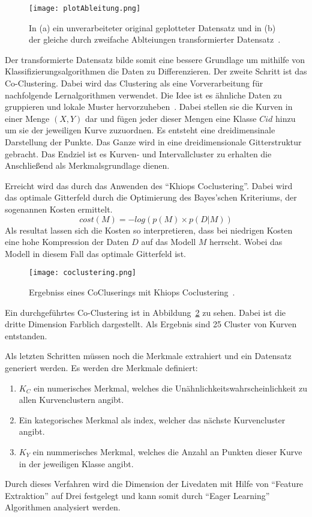 \begin{figure}
  \centering
  \texttt{[image: plotAbleitung.png]}
  \caption{In (a) ein unverarbeiteter original geplotteter Datensatz und in (b) der gleiche durch zweifache Ablteiungen transformierter Datensatz~\cite{Gay2013}.}
  \label{fig:derivative}
\end{figure}

Der transformierte Datensatz bilde somit eine bessere Grundlage um mithilfe von Klassifizierungsalgorithmen die Daten zu Differenzieren. 
Der zweite Schritt ist das Co-Clustering. 
Dabei wird das Clustering als eine Vorverarbeitung für nachfolgende Lernalgorithmen verwendet. 
Die Idee ist es ähnliche Daten zu gruppieren und lokale Muster hervorzuheben~\cite{gay2013feature}. Dabei stellen sie die Kurven in einer Menge $(X,Y)$ dar und fügen jeder dieser Mengen eine Klasse $Cid$ hinzu um sie der jeweiligen Kurve zuzuordnen. Es entsteht eine dreidimensinale Darstellung der Punkte. Das Ganze wird in eine dreidimensionale Gitterstruktur gebracht. Das Endziel ist es Kurven- und Intervallcluster zu erhalten die Anschließend als Merkmalsgrundlage dienen. 

Erreicht wird das durch das Anwenden des \enquote{Khiops Coclustering}\cite{boulle2012functional}. Dabei wird das optimale Gitterfeld durch die Optimierung des Bayes'schen Kriteriums, der sogenannen Kosten ermittelt. 
\begin{equation}
  cost(M) = -log(p(M) \times p(D|M))
  \label{equ:Bayesian}
\end{equation}
Als resultat lassen sich die Kosten so interpretieren, dass bei niedrigen Kosten eine hohe Kompression der Daten $D$ auf das Modell $M$ herrscht. Wobei das Modell in diesem Fall das optimale Gitterfeld ist.

\begin{figure}
  \centering
  \texttt{[image: coclustering.png]}
  \caption{Ergebniss eines CoCluserings mit Khiops Coclustering~\cite{Gay2013}.}
  \label{fig:coclustering}
\end{figure}

Ein durchgeführtes Co-Clustering ist in Abbildung\ \ref{fig:coclustering} zu sehen. Dabei ist die dritte Dimension Farblich dargestellt. Als Ergebnis sind 25 Cluster von Kurven entstanden. 

Als letzten Schritten müssen noch die Merkmale extrahiert und ein Datensatz generiert werden. Es werden dre Merkmale definiert:

\begin{enumerate}
  \item $K_C$ ein numerisches Merkmal, welches die Unähnlichkeitswahrscheinlichkeit zu allen Kurvenclustern angibt.
  \item Ein kategorisches Merkmal als index, welcher das nächste Kurvencluster angibt.
  \item $K_Y$ ein nummerisches Merkmal, welches die Anzahl an Punkten dieser Kurve in der jeweiligen Klasse angibt.
\end{enumerate}

Durch dieses Verfahren wird die Dimension der Livedaten mit Hilfe von \enquote{Feature Extraktion} auf Drei festgelegt und kann somit durch \enquote{Eager Learning} Algorithmen analysiert werden.
